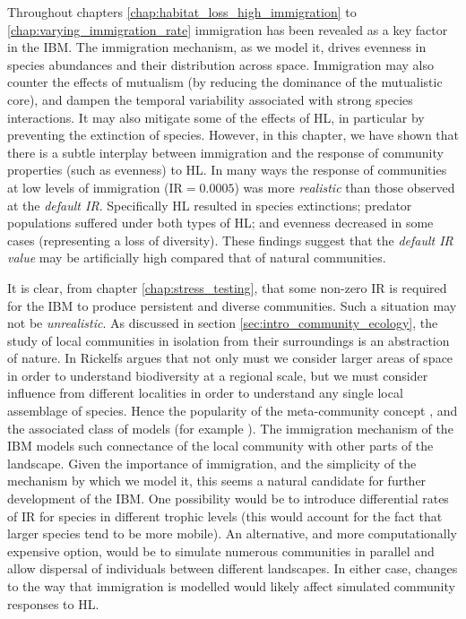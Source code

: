Throughout chapters \ref{chap:habitat_loss_high_immigration} to \ref{chap:varying_immigration_rate} immigration has been revealed as a key factor in the IBM. The immigration mechanism, as we model it, drives evenness in species abundances and their distribution across space. Immigration may also counter the effects of mutualism (by reducing the dominance of the mutualistic core), and dampen the temporal variability associated with strong species interactions. It may also mitigate some of the effects of HL, in particular by preventing the extinction of species. However, in this chapter, we have shown that there is a subtle interplay between immigration and the response of community properties (such as evenness) to HL. In many ways the response of communities at low levels of immigration (IR$=0.0005$) was more \emph{realistic} than those observed at the \emph{default IR}. Specifically HL resulted in species extinctions; predator populations suffered under both types of HL; and evenness decreased in some cases (representing a loss of diversity). These findings suggest that the \emph{default IR value} may be artificially high compared that of natural communities. 

It is clear, from chapter \ref{chap:stress_testing}, that some non-zero IR is required for the IBM to produce persistent and diverse communities. Such a situation may not be \emph{unrealistic}. As discussed in section \ref{sec:intro_community_ecology}, the study of local communities in isolation from their surroundings is an abstraction of nature. In \cite{ricklefs2008disintegration} Rickelfs argues that not only must we consider larger areas of space in order to understand biodiversity at a regional scale, but we must consider influence from different localities in order to understand any single local assemblage of species. Hence the popularity of the meta-community concept \cite{leibold2004metacommunity}, and the associated class of models (for example \cite{ovaskainen2002metapopulation}). The immigration mechanism of the IBM models such connectance of the local community with other parts of the landscape. Given the importance of immigration, and the simplicity of the mechanism by which we model it, this seems a natural candidate for further development of the IBM. One possibility would be to introduce differential rates of IR for species in different trophic levels (this would account for the fact that larger species tend to be more mobile). An alternative, and more computationally expensive option, would be to simulate numerous communities in parallel and allow dispersal of individuals between different landscapes. In either case, changes to the way that immigration is modelled would likely affect simulated community responses to HL. 

